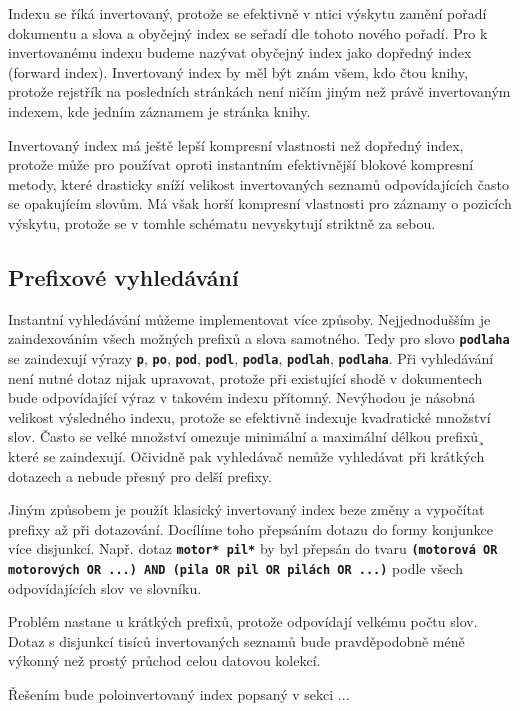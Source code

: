 \documentclass[11pt,letterpaper,oneside,openright]{book}
\newcommand{\bftt}[1]{\texttt{\textbf{#1}}}
\begin{document}
Indexu se říká invertovaný, protože se efektivně v ntici výskytu zamění pořadí
dokumentu a slova a obyčejný index se seřadí dle tohoto nového pořadí. Pro k
invertovanému indexu budeme nazývat obyčejný index jako dopředný index (forward
index). Invertovaný index by měl být znám všem, kdo čtou knihy, protože
rejstřík na posledních stránkách není ničím jiným než právě invertovaným
indexem, kde jedním záznamem je stránka knihy.

Invertovaný index má ještě lepší kompresní vlastnosti než dopředný index,
protože může pro používat oproti instantním efektivnější blokové kompresní
metody, které drasticky sníží velikost invertovaných seznamů odpovídajících
často se opakujícím slovům. Má však horší kompresní vlastnosti pro záznamy o
pozicích výskytu, protože se v tomhle schématu nevyskytují striktně za sebou.


\subsection{Prefixové vyhledávání} \label{sec:prefix_search}
Instantní vyhledávání můžeme implementovat více způsoby. Nejjednodušším je
zaindexováním všech možných prefixů a slova samotného. Tedy pro slovo
\bftt{podlaha} se zaindexují výrazy \bftt{p}, \bftt{po}, \bftt{pod},
\bftt{podl}, \bftt{podla}, \bftt{podlah}, \bftt{podlaha}. Při vyhledávání není
nutné dotaz nijak upravovat, protože při existující shodě v dokumentech bude
odpovídající výraz v takovém indexu přítomný. Nevýhodou je násobná velikost
výsledného indexu, protože se efektivně indexuje kvadratické množství slov.
Často se velké množství omezuje minimální a maximální délkou prefixů¸ které se
zaindexují.  Očividně pak vyhledávač nemůže vyhledávat při krátkých dotazech a
nebude přesný pro delší prefixy.

Jiným způsobem je použít klasický invertovaný index beze změny a vypočítat
prefixy až při dotazování.  Docílíme toho přepsáním dotazu do formy konjunkce
více disjunkcí. Např. dotaz \bftt{motor* pil*} by byl přepsán do tvaru
\bftt{(motorová OR motorových OR ...) AND (pila OR pil OR pilách OR ...)} podle
všech odpovídajících slov ve slovníku.

Problém nastane u krátkých prefixů, protože odpovídají velkému počtu slov.
Dotaz s disjunkcí tisíců invertovaných seznamů bude pravděpodobně méně výkonný
než prostý průchod celou datovou kolekcí.

Řešením bude poloinvertovaný index popsaný v sekci ...
\end{document}
